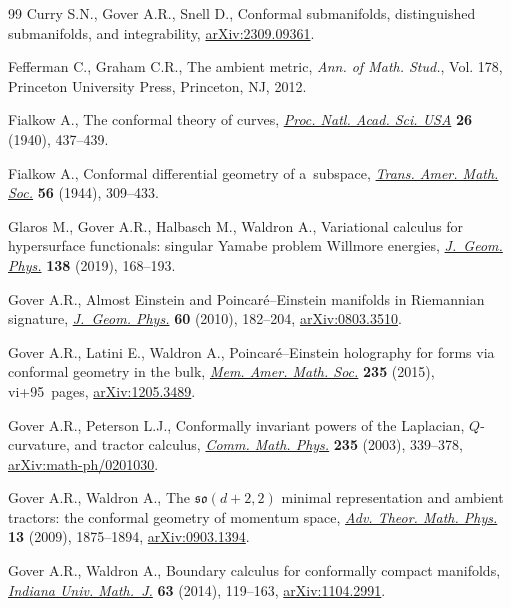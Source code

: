 \documentclass[pdftex]{sigma}
\numberwithin{equation}{section}
\renewcommand{\=}{\stackrel \Lambda =}
\begin{document}
\begin{thebibliography}{99}
Curry S.N., Gover A.R., Snell D., Conformal submanifolds, distinguished
 submanifolds, and integrability, \href{https://arxiv.org/abs/2309.09361}{arXiv:2309.09361}.

Fefferman C., Graham C.R., The ambient metric, \textit{Ann. of Math. Stud.},
 Vol. 178, Princeton University Press, Princeton, NJ, 2012.

Fialkow A., The conformal theory of curves, \href{https://doi.org/10.1073/pnas.26.6.437}{\textit{Proc. Natl. Acad. Sci. USA}}
 \textbf{26} (1940), 437--439.

Fialkow A., Conformal differential geometry of a~subspace, \href{https://doi.org/10.2307/1990251}{\textit{Trans. Amer.
 Math. Soc.}} \textbf{56} (1944), 309--433.

Glaros M., Gover A.R., Halbasch M., Waldron A., Variational calculus for
 hypersurface functionals: singular {Y}amabe problem {W}illmore energies,
 \href{https://doi.org/10.1016/j.geomphys.2018.12.018}{\textit{J.~Geom. Phys.}} \textbf{138} (2019), 168--193.

Gover A.R., Almost {E}instein and {P}oincar\'e--{E}instein manifolds in
 {R}iemannian signature, \href{https://doi.org/10.1016/j.geomphys.2009.09.016}{\textit{J.~Geom. Phys.}} \textbf{60} (2010), 182--204,
 \href{https://arxiv.org/abs/0803.3510}{arXiv:0803.3510}.

Gover A.R., Latini E., Waldron A., {P}oincar\'e--{E}instein holography for
 forms via conformal geometry in the bulk, \href{https://doi.org/10.1090/memo/1106}{\textit{Mem. Amer. Math. Soc.}}
 \textbf{235} (2015), vi+95~pages, \href{https://arxiv.org/abs/1205.3489}{arXiv:1205.3489}.

Gover A.R., Peterson L.J., Conformally invariant powers of the {L}aplacian,
 {$Q$}-curvature, and tractor calculus, \href{https://doi.org/10.1007/s00220-002-0790-4}{\textit{Comm. Math. Phys.}}
 \textbf{235} (2003), 339--378, \href{https://arxiv.org/abs/math-ph/0201030}{arXiv:math-ph/0201030}.

Gover A.R., Waldron A., The {$\mathfrak{so}(d+2,2)$} minimal representation and
 ambient tractors: the conformal geometry of momentum space, \href{https://doi.org/10.4310/atmp.2009.v13.n6.a7}{\textit{Adv.
 Theor. Math. Phys.}} \textbf{13} (2009), 1875--1894, \href{https://arxiv.org/abs/0903.1394}{arXiv:0903.1394}.

Gover A.R., Waldron A., Boundary calculus for conformally compact manifolds,
 \href{https://doi.org/10.1512/iumj.2014.63.5057}{\textit{Indiana Univ. Math.~J.}} \textbf{63} (2014), 119--163,
 \href{https://arxiv.org/abs/1104.2991}{arXiv:1104.2991}.


\end{thebibliography}
\end{document}
